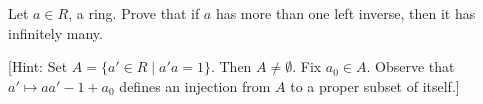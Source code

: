 Let $a \in R$, a ring. Prove that if $a$ has more than one left inverse, then it has infinitely many.

[Hint: Set $A = \{a' \in R \mid a'a = 1\}$. Then $A \neq \emptyset$. Fix $a_0 \in A$. Observe that $a' \mapsto aa' - 1 + a_0$ defines an injection from $A$ to a proper subset of itself.]
